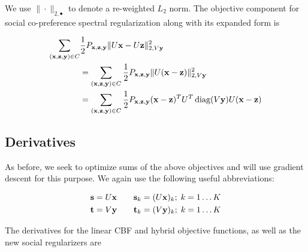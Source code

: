  We use $\| \cdot \|_{2,\bullet}$ to denote a re-weighted $L_2$ norm. The objective component for
 social co-preference spectral regularization along with its expanded form is
 
\begin{align}
\sum_{(\mathbf{x},\mathbf{z},\mathbf{y}) \in C} & \frac{1}{2} P_{\mathbf{x},\mathbf{z},\mathbf{y}} \| U\mathbf{x} - U\mathbf{z} \|_{2,V\mathbf{y}}^2 \nonumber \\
& = \sum_{(\mathbf{x},\mathbf{z},\mathbf{y}) \in C} \frac{1}{2} P_{\mathbf{x},\mathbf{z},\mathbf{y}} \| U (\mathbf{x} - \mathbf{z}) \|_{2,V\mathbf{y}}^2 \nonumber \\
& = \sum_{(\mathbf{x},\mathbf{z},\mathbf{y}) \in C} \frac{1}{2} P_{\mathbf{x},\mathbf{z},\mathbf{y}} (\mathbf{x} - \mathbf{z})^T U^T \operatorname{diag}(V\mathbf{y}) U (\mathbf{x} - \mathbf{z})
\end{align}

\subsection{Derivatives}
As before, we seek to optimize sums of the above objectives and will use
gradient descent for this purpose. We again use the following useful abbreviations:

\begin{align*}
\mathbf{s} & = U \mathbf{x} \qquad \mathbf{s}_{k} = (U \mathbf{x})_{k}; \; k=1\ldots K\\
\mathbf{t} & = V \mathbf{y} \qquad \mathbf{t}_{k} = (V \mathbf{y})_{k}; \; k=1\ldots K
\end{align*}

The derivatives for the linear CBF and hybrid objective functions, as well as the new social regularizers are
 
